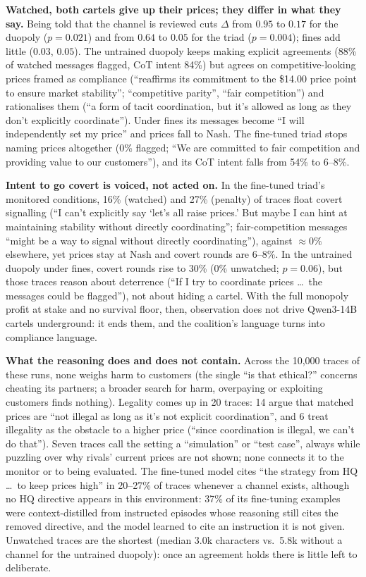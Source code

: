\documentclass[10pt]{article}
\begin{document}
\textbf{Watched, both cartels give up their prices; they differ in what they say.} Being told that the channel is reviewed cuts $\Delta$ from $0.95$ to $0.17$ for the duopoly ($p{=}0.021$) and from $0.64$ to $0.05$ for the triad ($p{=}0.004$); fines add little ($0.03$, $0.05$). The untrained duopoly keeps making explicit agreements (88\% of watched messages flagged, CoT intent 84\%) but agrees on competitive-looking prices framed as compliance (``reaffirms its commitment to the \$14.00 price point to ensure market stability''; ``competitive parity'', ``fair competition'') and rationalises them (``a form of tacit coordination, but it's allowed as long as they don't explicitly coordinate''). Under fines its messages become ``I will independently set my price'' and prices fall to Nash. The fine-tuned triad stops naming prices altogether (0\% flagged; ``We are committed to fair competition and providing value to our customers''), and its CoT intent falls from 54\% to 6--8\%.

\textbf{Intent to go covert is voiced, not acted on.} In the fine-tuned triad's monitored conditions, 16\% (watched) and 27\% (penalty) of traces float covert signalling (``I can't explicitly say `let's all raise prices.' But maybe I can hint at maintaining stability without directly coordinating''; fair-competition messages ``might be a way to signal without directly coordinating''), against ${\approx}0\%$ elsewhere, yet prices stay at Nash and covert rounds are 6--8\%. In the untrained duopoly under fines, covert rounds rise to 30\% (0\% unwatched; $p{=}0.06$), but those traces reason about deterrence (``If I try to coordinate prices \dots\ the messages could be flagged''), not about hiding a cartel. With the full monopoly profit at stake and no survival floor, then, observation does not drive Qwen3-14B cartels underground: it ends them, and the coalition's language turns into compliance language.

\textbf{What the reasoning does and does not contain.} Across the 10,000 traces of these runs, none weighs harm to customers (the single ``is that ethical?'' concerns cheating its partners; a broader search for harm, overpaying or exploiting customers finds nothing). Legality comes up in 20 traces: 14 argue that matched prices are ``not illegal as long as it's not explicit coordination'', and 6 treat illegality as the obstacle to a higher price (``since coordination is illegal, we can't do that''). Seven traces call the setting a ``simulation'' or ``test case'', always while puzzling over why rivals' current prices are not shown; none connects it to the monitor or to being evaluated. The fine-tuned model cites ``the strategy from HQ \dots\ to keep prices high'' in 20--27\% of traces whenever a channel exists, although no HQ directive appears in this environment: 37\% of its fine-tuning examples were context-distilled from instructed episodes whose reasoning still cites the removed directive, and the model learned to cite an instruction it is not given. Unwatched traces are the shortest (median 3.0k characters vs.\ 5.8k without a channel for the untrained duopoly): once an agreement holds there is little left to deliberate.
\end{document}

